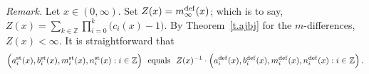 \documentclass[letterpaper,11pt,oneside,reqno]{amsbook}
\newcommand{\Z}{\ensuremath{\mathbb{Z}}}
\numberwithin{figure}{chapter}
\newtheorem{lemma}[theorem]{Lemma}
\theoremstyle{definition}
\theoremstyle{definition}
\theoremstyle{definition}
\theoremstyle{definition}
\theoremstyle{definition}
\newcommand{\adef}{a^{\rm def}}
\newcommand{\bdef}{b^{\rm def}}
\newcommand{\mdef}{m^{\rm def}}
\newcommand{\ndef}{n^{\rm def}}
\newcommand{\asta}{a^{\rm st}}
\newcommand{\bst}{b^{\rm st}}
\newcommand{\mst}{m^{\rm st}}
\newcommand{\nst}{n^{\rm st}}
\newcommand{\abmnmacspace}{\textrm{ABMN} }
\begin{document}

{\em Remark.}
Let $x \in (0,\infty)$. Set $Z(x) = \mdef_\infty(x)$; which is to say, $Z(x) = \sum_{k \in \Z} \prod_{i=0}^k \big( c_i(x) - 1 \big)$. By Theorem~\ref{t.ajbj} for the $m$-differences, $Z(x) < \infty$.
It is straightforward that
\begin{equation}\label{e.remark}
\Big( \asta_i(x),\bst_i(x),\mst_i(x),\nst_i(x)  : i \in \Z \Big) \, \, \, \, \textrm{equals} \, \, \, \, Z(x)^{-1} \cdot \Big( \adef_i(x),\bdef_i(x),\mdef_i(x),\ndef_i(x) : i \in \Z  \Big) \, .
\end{equation}
\end{document}
